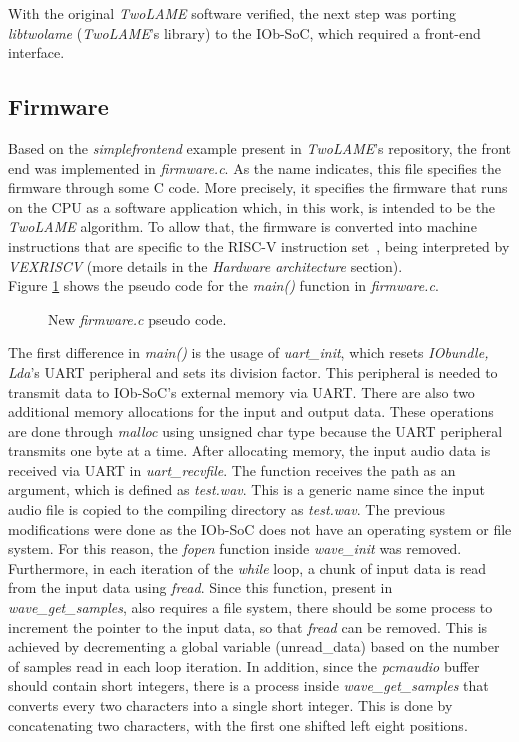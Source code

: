With the original \textit{TwoLAME} software verified, the next step was porting \textit{libtwolame} (\textit{TwoLAME}'s library) to the IOb-SoC, which required a front-end interface.

\subsection{Firmware}

Based on the \textit{simplefrontend} example present in \textit{TwoLAME}'s repository, the front end was implemented in \textit{firmware.c}. As the name indicates, this file specifies the firmware through some C code. More precisely, it specifies the firmware that runs on the CPU as a software application which, in this work, is intended to be the \textit{TwoLAME} algorithm. To allow that, the firmware is converted into machine instructions that are specific to the RISC-V instruction set~\cite{bib:riscvmanual_iieec}, being interpreted by \textit{VEXRISCV} (more details in the \textit{Hardware architecture} section).\\
Figure \ref{newpseudo} shows the pseudo code for the \textit{main()} function in \textit{firmware.c}.

\begin{figure}[H]
\centerline{}
\caption{New \textit{firmware.c} pseudo code.}
\label{newpseudo}
\end{figure}

The first difference in \textit{main()} is the usage of \textit{uart\_init}, which resets \textit{IObundle, Lda}’s UART peripheral and sets its division factor. This peripheral is needed to transmit data to IOb-SoC's external memory via UART. 
There are also two additional memory allocations for the input and output data. These operations are done through \textit{malloc} using unsigned char type because the UART peripheral transmits one byte at a time.
After allocating memory, the input audio data is received via UART in \textit{uart\_recvfile}. The function receives the path as an argument, which is defined as \textit{test.wav}. This is a generic name since the input audio file is copied to the compiling directory as \textit{test.wav}.
The previous modifications were done as the IOb-SoC does not have an operating system or file system. For this reason, the \textit{fopen} function inside \textit{wave\_init} was removed. Furthermore, in each iteration of the \textit{while} loop, a chunk of input data is read from the input data using \textit{fread}. Since this function, present in \textit{wave\_get\_samples}, also requires a file system, there should be some process to increment the pointer to the input data, so that \textit{fread} can be removed. This is achieved by decrementing a global variable (unread\_data) based on the number of samples read in each loop iteration. In addition, since the \textit{pcmaudio} buffer should contain short integers, there is a process inside \textit{wave\_get\_samples} that converts every two characters into a single short integer. This is done by concatenating two characters, with the first one shifted left eight positions.

